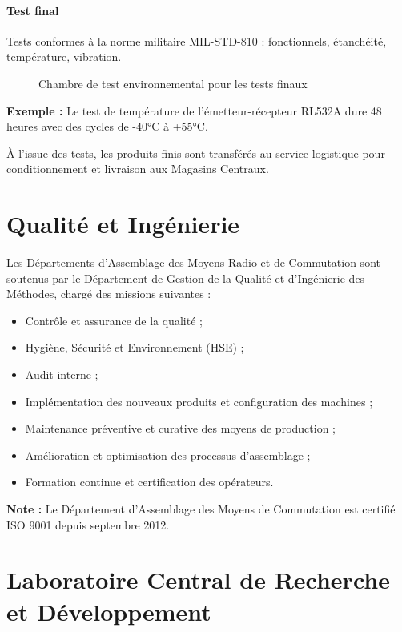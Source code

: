 \paragraph{Test final}

Tests conformes à la norme militaire MIL-STD-810 : fonctionnels, étanchéité, température, vibration.

\begin{figure}[H]
    \centering
    \caption{Chambre de test environnemental pour les tests finaux}
    \label{fig:chambre_environnementale}
\end{figure}

\textbf{Exemple :} Le test de température de l'émetteur-récepteur RL532A dure 48 heures avec des cycles de -40°C à +55°C.

À l'issue des tests, les produits finis sont transférés au service logistique pour conditionnement et livraison aux Magasins Centraux.

\section{Qualité et Ingénierie}
\label{sec:qualite_ingenierie}

Les Départements d'Assemblage des Moyens Radio et de Commutation sont soutenus par le Département de Gestion de la Qualité et d'Ingénierie des Méthodes, chargé des missions suivantes :
\begin{itemize}
    \item Contrôle et assurance de la qualité ;
    \item Hygiène, Sécurité et Environnement (HSE) ;
    \item Audit interne ;
    \item Implémentation des nouveaux produits et configuration des machines ;
    \item Maintenance préventive et curative des moyens de production ;
    \item Amélioration et optimisation des processus d'assemblage ;
    \item Formation continue et certification des opérateurs.
\end{itemize}

\textbf{Note :} Le Département d'Assemblage des Moyens de Commutation est certifié ISO 9001 depuis septembre 2012.

\section{Laboratoire Central de Recherche et Développement}
\label{sec:labo_rd}

